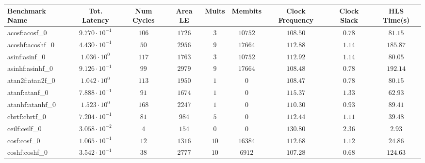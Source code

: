 \begin{tabular}{|l|c|c|c|c|c|c|c|c|}
\hline
Benchmark Name               & Tot. Latency            & Num Cycles & Area LE   & Mults   & Membits    & Clock Frequency & Clock Slack & HLS Time(s) \\
\hline
acosf:acosf\_0               & $ 9.770 \cdot 10^{-1} $ & $ 106    $ & $ 1726  $ & $ 3   $ & $ 10752  $ & $ 108.50      $ & $ 0.78    $ & $ 81.15   $ \\
acoshf:acoshf\_0             & $ 4.430 \cdot 10^{-1} $ & $ 50     $ & $ 2956  $ & $ 9   $ & $ 17664  $ & $ 112.88      $ & $ 1.14    $ & $ 185.87  $ \\
asinf:asinf\_0               & $ 1.036 \cdot 10^{0}  $ & $ 117    $ & $ 1763  $ & $ 3   $ & $ 10752  $ & $ 112.92      $ & $ 1.14    $ & $ 80.05   $ \\
asinhf:asinhf\_0             & $ 9.126 \cdot 10^{-1} $ & $ 99     $ & $ 2979  $ & $ 9   $ & $ 17664  $ & $ 108.48      $ & $ 0.78    $ & $ 192.14  $ \\
atan2f:atan2f\_0             & $ 1.042 \cdot 10^{0}  $ & $ 113    $ & $ 1950  $ & $ 1   $ & $ 0      $ & $ 108.47      $ & $ 0.78    $ & $ 80.15   $ \\
atanf:atanf\_0               & $ 7.888 \cdot 10^{-1} $ & $ 91     $ & $ 1674  $ & $ 1   $ & $ 0      $ & $ 115.37      $ & $ 1.33    $ & $ 62.93   $ \\
atanhf:atanhf\_0             & $ 1.523 \cdot 10^{0}  $ & $ 168    $ & $ 2247  $ & $ 1   $ & $ 0      $ & $ 110.30      $ & $ 0.93    $ & $ 89.41   $ \\
cbrtf:cbrtf\_0               & $ 7.204 \cdot 10^{-1} $ & $ 81     $ & $ 984   $ & $ 5   $ & $ 0      $ & $ 112.44      $ & $ 1.11    $ & $ 39.48   $ \\
ceilf:ceilf\_0               & $ 3.058 \cdot 10^{-2} $ & $ 4      $ & $ 154   $ & $ 0   $ & $ 0      $ & $ 130.80      $ & $ 2.36    $ & $ 2.93    $ \\
cosf:cosf\_0                 & $ 1.065 \cdot 10^{-1} $ & $ 12     $ & $ 1316  $ & $ 10  $ & $ 16384  $ & $ 112.68      $ & $ 1.12    $ & $ 24.86   $ \\
coshf:coshf\_0               & $ 3.542 \cdot 10^{-1} $ & $ 38     $ & $ 2777  $ & $ 10  $ & $ 6912   $ & $ 107.28      $ & $ 0.68    $ & $ 124.63  $ \\

\end{tabular}
